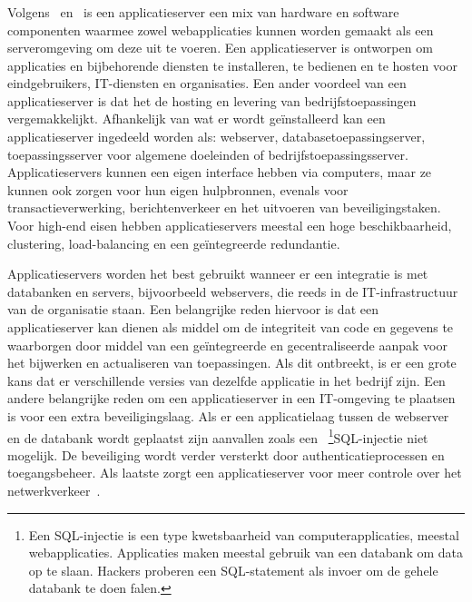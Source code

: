 \subsubsection{}
\label{subsubsec:Applicatieserver}
Volgens~\textcite{TechTerms2019} en~\textcite{ProTeam2018} is een applicatieserver een mix van hardware en software componenten waarmee zowel webapplicaties kunnen worden gemaakt als een serveromgeving om deze uit te voeren. Een applicatieserver is ontworpen om applicaties en bijbehorende diensten te installeren, te bedienen en te hosten voor eindgebruikers, IT-diensten en organisaties. Een ander voordeel van een applicatieserver is dat het de hosting en levering van bedrijfstoepassingen vergemakkelijkt. Afhankelijk van wat er wordt geïnstalleerd kan een applicatieserver ingedeeld worden als: webserver, databasetoepassingserver, toepassingsserver voor algemene doeleinden of bedrijfstoepassingsserver. Applicatieservers kunnen een eigen interface hebben via computers, maar ze kunnen ook zorgen voor hun eigen hulpbronnen, evenals voor transactieverwerking, berichtenverkeer en het uitvoeren van beveiligingstaken. Voor high-end eisen hebben applicatieservers meestal een hoge beschikbaarheid, clustering, load-balancing en een geïntegreerde redundantie. 

Applicatieservers worden het best gebruikt wanneer er een integratie is met databanken en servers, bijvoorbeeld webservers, die reeds in de IT-infrastructuur van de organisatie staan. Een belangrijke reden hiervoor is dat een applicatieserver kan dienen als middel om de integriteit van code en gegevens te waarborgen door middel van een geïntegreerde en gecentraliseerde aanpak voor het bijwerken en actualiseren van toepassingen. Als dit ontbreekt, is er een grote kans dat er verschillende versies van dezelfde applicatie in het bedrijf zijn. Een andere belangrijke reden om een applicatieserver in een IT-omgeving te plaatsen is voor een extra beveiligingslaag. Als er een applicatielaag tussen de webserver en de databank wordt geplaatst zijn aanvallen zoals een ~\footnote{Een SQL-injectie is een type kwetsbaarheid van computerapplicaties, meestal webapplicaties. Applicaties maken meestal gebruik van een databank om data op te slaan. Hackers proberen een SQL-statement als invoer om de gehele databank te doen falen.}SQL-injectie niet mogelijk. De beveiliging wordt verder versterkt door authenticatieprocessen en toegangsbeheer. Als laatste zorgt een applicatieserver voor meer controle over het netwerkverkeer~\autocite{ProTeam2018}. 

